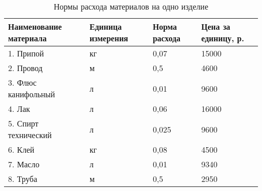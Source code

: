 \begin{table}[h!]
{\begin{tabular}{| p{} | p{} | p{} |}
    \end{tabular}
  }
\end{table}

\begin{table}[h!]
  \caption{Нормы расхода материалов на одно изделие}
  \label{tbl:material_costs}
  \centering
  \small{
    \begin{tabular}{| p{} | p{} |
                      p{} | p{} |}
      \hline
      Наименование материала & Единица измерения &
      Норма расхода & Цена за единицу, р. \\ \hline

      1. Припой             & кг & 0,07  & 15000 \\ \hline
      2. Провод             & м  & 0,5   & 4600  \\ \hline
      3. Флюс канифольный   & л  & 0,01  & 9600  \\ \hline
      4. Лак                & л  & 0,06  & 16000 \\ \hline
      5. Спирт технический  & л  & 0,025 & 9600  \\ \hline
      6. Клей               & кг & 0,08  & 4500  \\ \hline
      7. Масло              & л  & 0,01  & 9340  \\ \hline
      8. Труба              & м  & 0,5   & 2950  \\ \hline

    \end{tabular}
  }
\end{table}

